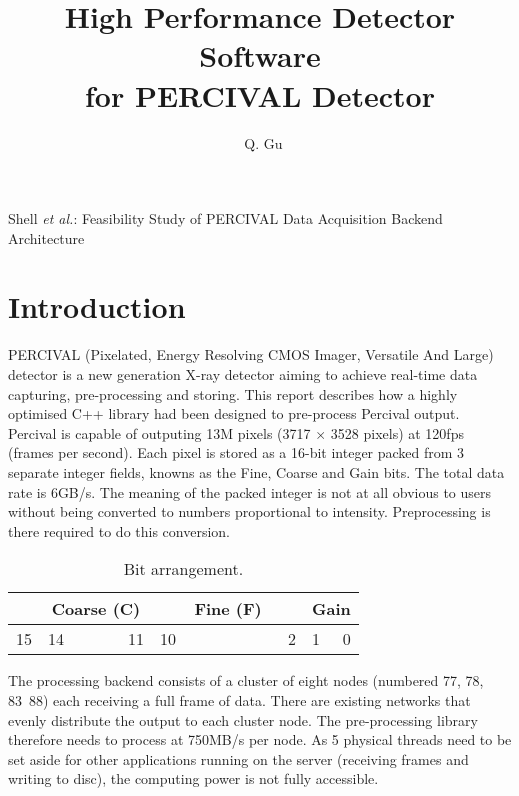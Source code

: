 \documentclass[journal]{IEEEtran}
\begin{document}
\title{High Performance Detector Software\\
for PERCIVAL Detector}

\author{~Q. Gu}

%
{Shell \MakeLowercase{\textit{et al.}}: Feasibility Study of PERCIVAL Data
Acquisition Backend Architecture}

\maketitle

\begin{abstract}

\end{abstract}

\section{Introduction}

 PERCIVAL\cite{wunderer2014percival} (Pixelated, Energy Resolving CMOS Imager, Versatile And Large) detector is a new generation X-ray detector aiming to achieve real-time data capturing, pre-processing and storing. This report describes how a highly optimised C++ library had been designed to pre-process Percival output. \\ 
Percival is capable of outputing \texttildelow 13M pixels (3717 $\times$ 3528 pixels) at 120fps (frames per second). Each pixel is stored as a 16-bit integer packed from 3 separate integer fields, knowns as the Fine, Coarse and Gain bits. The total data rate is \texttildelow 6GB/s. The meaning of the packed integer is not at all obvious to users without being converted to numbers proportional to intensity. Preprocessing is there required to do this conversion.

\begin{table}[h]
\centering
\label{bit_arrangement}
\begin{tabular}{r l c c c r l c c c c c c  r l r}
\hline
\multicolumn{1}{|c|}{} & 
\multicolumn{5}{|c|}{Coarse (C)} & 
\multicolumn{8}{|c|}{Fine (F)} &
\multicolumn{2}{|c|}{Gain} \\
\hline
 15 & 14 & & & & 11 & 10 & & & & & & & 2 & 1 & 0 \\
\end{tabular}
\caption{Bit arrangement.}
\end{table}

The processing backend consists of a cluster of eight nodes (numbered 77, 78, 83~88) each receiving a full frame of data. There are existing networks that evenly distribute the output to each cluster node. The pre-processing library therefore needs to process at \texttildelow 750MB/s per node. As 5 physical threads need to be set aside for other applications running on the server (receiving frames and writing to disc), the computing power is not fully accessible. 
\end{document}
